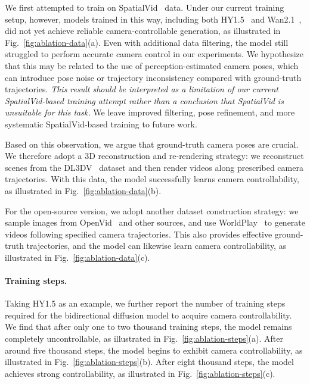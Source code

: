 We first attempted to train on SpatialVid~\cite{wang2025spatialvid} data. Under our current training setup, however, models trained in this way, including both HY1.5~\cite{kong2024hunyuanvideo} and Wan2.1~\cite{wan2025wan}, did not yet achieve reliable camera-controllable generation, as illustrated in Fig.~\ref{fig:ablation-data}(a). Even with additional data filtering, the model still struggled to perform accurate camera control in our experiments. We hypothesize that this may be related to the use of perception-estimated camera poses, which can introduce pose noise or trajectory inconsistency compared with ground-truth trajectories. \textit{This result should be interpreted as a limitation of our current SpatialVid-based training attempt rather than a conclusion that SpatialVid is unsuitable for this task.} We leave improved filtering, pose refinement, and more systematic SpatialVid-based training to future work.


Based on this observation, we argue that ground-truth camera poses are crucial. We therefore adopt a 3D reconstruction and re-rendering strategy: we reconstruct scenes from the DL3DV~\cite{ling2024dl3dv} dataset and then render videos along prescribed camera trajectories. With this data, the model successfully learns camera controllability, as illustrated in Fig.~\ref{fig:ablation-data}(b).

For the open-source version, we adopt another dataset construction strategy: we sample images from OpenVid~\cite{nan2024openvid} and other sources, and use WorldPlay~\cite{sun2025worldplay} to generate videos following specified camera trajectories. This also provides effective ground-truth trajectories, and the model can likewise learn camera controllability, as illustrated in Fig.~\ref{fig:ablation-data}(c).


\paragraph{Training steps.} 

Taking HY1.5 as an example, we further report the number of training steps required for the bidirectional diffusion model to acquire camera controllability. We find that after only one to two thousand training steps, the model remains completely uncontrollable, as illustrated in Fig.~\ref{fig:ablation-steps}(a). After around five thousand steps, the model begins to exhibit camera controllability, as illustrated in Fig.~\ref{fig:ablation-steps}(b). After eight thousand steps, the model achieves strong controllability, as illustrated in Fig.~\ref{fig:ablation-steps}(c).

